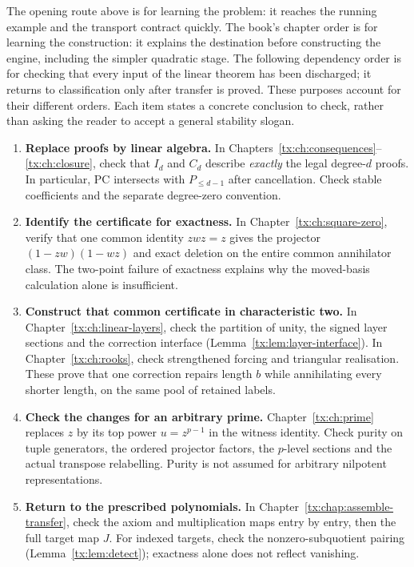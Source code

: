 The opening route above is for learning the problem: it reaches the
running example and the transport contract quickly. The book's chapter
order is for learning the construction: it explains the destination
before constructing the engine, including the simpler quadratic stage.
The following dependency order is for checking that every input of the
linear theorem has been discharged; it returns to classification only
after transfer is proved. These purposes account for their different
orders. Each item
states a concrete conclusion to check, rather than asking the reader to
accept a general stability slogan.
\begin{enumerate}
\item \textbf{Replace proofs by linear algebra.}
In Chapters~\ref{tx:ch:consequences}--\ref{tx:ch:closure}, check that
$I_d$ and $C_d$ describe \emph{exactly} the legal degree-$d$ proofs.
In particular, PC intersects with $P_{\le d-1}$ after cancellation.
Check stable coefficients and the separate degree-zero convention.
\item \textbf{Identify the certificate for exactness.}
In Chapter~\ref{tx:ch:square-zero}, verify that one common identity
$zwz=z$ gives the projector $(1-zw)(1-wz)$ and exact deletion on
the entire common annihilator class. The two-point failure of exactness
explains why the moved-basis calculation alone is insufficient.
\item \textbf{Construct that common certificate in characteristic two.}
In Chapter~\ref{tx:ch:linear-layers}, check the partition of unity,
the signed layer sections and the correction interface
(Lemma~\ref{tx:lem:layer-interface}). In Chapter~\ref{tx:ch:rooks},
check strengthened forcing and triangular realisation. These prove that
one correction repairs length $b$ while annihilating every shorter
length, on the same pool of retained labels.
\item \textbf{Check the changes for an arbitrary prime.}
Chapter~\ref{tx:ch:prime} replaces $z$ by its top power
$u=z^{p-1}$ in the witness identity. Check purity on tuple generators,
the ordered projector factors, the $p$-level sections and the actual
transpose relabelling. Purity is not assumed for arbitrary nilpotent
representations.
\item \textbf{Return to the prescribed polynomials.}
In Chapter~\ref{tx:chap:assemble-transfer}, check the axiom and
multiplication maps entry by entry, then the full target map $J$.
For indexed targets, check the nonzero-subquotient pairing
(Lemma~\ref{tx:lem:detect}); exactness alone does not reflect vanishing.

\end{enumerate}
